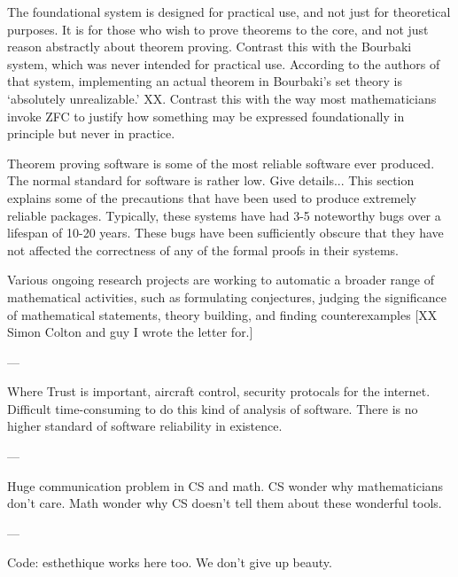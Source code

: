\documentclass{llncs}
\begin{document}
The foundational system is designed for practical use, and not just for theoretical purposes.  It is for those who wish to prove theorems to the core, and not just reason abstractly about theorem proving.  Contrast this with the Bourbaki system, which was never intended for practical use.  According to the authors of that system, implementing an actual theorem in Bourbaki's set theory is `absolutely unrealizable.' XX.
Contrast this with the way most mathematicians invoke ZFC to justify how something may be expressed  foundationally in principle but never in practice.

Theorem proving software is some of the most reliable software ever
produced.  The normal standard for software is rather low.  Give details...
This section explains some of the precautions that have been used
to produce extremely reliable packages.  Typically, these systems
have had 3-5 noteworthy bugs over a lifespan of 10-20 years. 
These bugs have been sufficiently obscure that they have not affected
the correctness of any of the formal proofs in their systems.

Various ongoing research projects are working to automatic a broader range
of mathematical activities, such as formulating conjectures, judging the significance of mathematical statements, theory building, and finding counterexamples [XX Simon Colton and guy I wrote the letter for.]

---

Where Trust is important, aircraft control, 
security protocals for the internet.  Difficult time-consuming
to do this kind of analysis of software.
There is no higher standard of software reliability in existence.

---

Huge communication problem in CS and math.
CS wonder why mathematicians don't care.
Math wonder why CS doesn't tell them about these wonderful tools.

---

Code: esthethique works here too.  We don't give up beauty.
\end{document}
